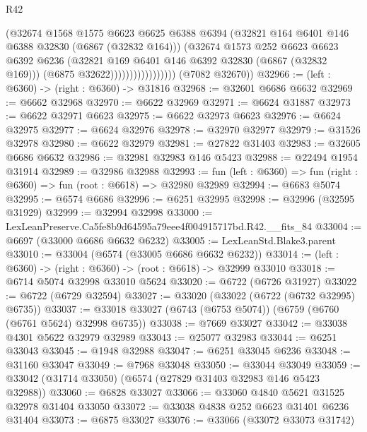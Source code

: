 \begin{lexlean}{R42}
\begin{coremodule}
{                                  (@32674
                                    @1568
                                    @1575
                                    @6623
                                    @6625
                                    @6388
                                    @6394
                                    (@32821 @164 @6401 @146 @6388 @32830 (@6867 (@32832 @164)))
                                    (@32674
                                      @1573
                                      @252
                                      @6623
                                      @6623
                                      @6392
                                      @6236
                                      (@32821 @169 @6401 @146 @6392 @32830 (@6867 (@32832 @169)))
                                      (@6875 @32622)))))))))))))))))
      (@7082 @32670))
@32966 := (left : @6360) -> (right : @6360) -> @31816
@32968 := @32601 @6686 @6632
@32969 := @6662 @32968
@32970 := @6622 @32969
@32971 := @6624 @31887
@32973 := @6622 @32971 @6623
@32975 := @6622 @32973 @6623
@32976 := @6624 @32975
@32977 := @6624 @32976
@32978 := @32970 @32977
@32979 := @31526 @32978
@32980 := @6622 @32979
@32981 := @27822 @31403
@32983 := @32605 @6686 @6632
@32986 := @32981 @32983 @146 @5423
@32988 := @22494 @1954 @31914
@32989 := @32986 @32988
@32993 := fun (left : @6360) => fun (right : @6360) => fun (root : @6618) => @32980 @32989
@32994 := @6683 @5074
@32995 := @6574 @6686
@32996 := @6251 @32995
@32998 := @32996 (@32595 @31929)
@32999 := @32994 @32998
@33000 := LexLeanPreserve.Ca5fe8b9d64595a79eee4f004915717bd.R42.__fits_84
@33004 := @6697 (@33000 @6686 @6632 @6232)
@33005 := LexLeanStd.Blake3.parent
@33010 := @33004 (@6574 (@33005 @6686 @6632 @6232))
@33014 := (left : @6360) -> (right : @6360) -> (root : @6618) -> @32999 @33010
@33018 := @6714 @5074 @32998 @33010 @5624
@33020 := @6722 (@6726 @31927)
@33022 := @6722 (@6729 @32594)
@33027 := @33020 (@33022 (@6722 (@6732 @32995) @6735))
@33037 := @33018 @33027 (@6743 (@6753 @5074)) (@6759 (@6760 (@6761 @5624) @32998 @6735))
@33038 := @7669 @33027
@33042 := @33038 @4301 @5622 @32979 @32989
@33043 := @25077 @32983
@33044 := @6251 @33043
@33045 := @1948 @32988
@33047 := @6251 @33045 @6236
@33048 := @31160 @33047
@33049 := @7968 @33048
@33050 := @33044 @33049
@33059 := @33042 (@31714 @33050) (@6574 (@27829 @31403 @32983 @146 @5423 @32988))
@33060 := @6828 @33027
@33066 := @33060 @4840 @5621 @31525 @32978 @31404 @33050
@33072 := @33038 @4838 @252 @6623 @31401 @6236 @31404
@33073 := @6875 @33027
@33076 := @33066 (@33072 @33073 @31742)
}
\end{coremodule}
\end{lexlean}
